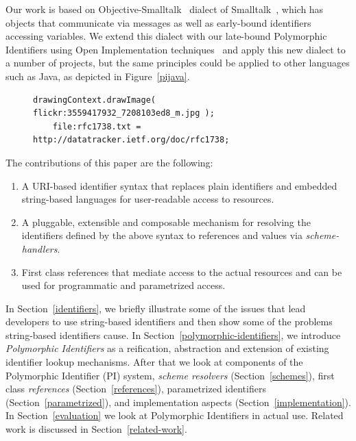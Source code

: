 \documentclass[preprint]{sigplanconf}
\begin{document}
Our work is based on Objective-Smalltalk~\cite{objst} dialect of Smalltalk~\cite{Goldberg1983}, which has objects
that communicate via messages as well as early-bound identifiers accessing variables.  We extend
this dialect with our late-bound Polymorphic Identifiers using Open Implementation techniques~\cite{OpenImplementations} and apply this new dialect to a number of
projects, but the same principles could be applied to other languages such as Java, as depicted in
Figure~\ref{pijava}.


\begin{figure}[htbp]
\begin{lstlisting}[style=numbers,label=pijava,caption=Draw a remote image and download an RFC with Polymorphic Identifiers in Java.]
	drawingContext.drawImage( flickr:3559417932_7208103ed8_m.jpg );
	file:rfc1738.txt = http://datatracker.ietf.org/doc/rfc1738;
\end{lstlisting}
\end{figure}



The contributions of this paper are the following:
\begin{enumerate} 

\item A URI-based identifier syntax that replaces plain identifiers
	and embedded string-based languages for user-readable access to resources.

\item A pluggable, extensible and composable mechanism for resolving the
	identifiers defined by the above syntax to references and values via \emph{scheme-handlers}.

\item First class references that mediate access to the actual resources and can be used
	for programmatic and parametrized access.
	 
	
\end{enumerate}



In Section~\ref{identifiers}, we briefly illustrate some of the issues that lead developers to use string-based
identifiers and then show some of 
the problems string-based identifiers cause.  In Section~\ref{polymorphic-identifiers}, we 
introduce \emph{Polymorphic Identifiers} as a reification, abstraction and extension of existing 
identifier lookup mechanisms.  After that we look at components of the Polymorphic Identifier (PI)
system, \emph{scheme resolvers} (Section~\ref{schemes}), first class \emph{references} (Section~\ref{references}),
parametrized identifiers (Section~\ref{parametrized}), and  implementation aspects (Section~\ref{implementation}).
In Section~\ref{evaluation} we look at Polymorphic Identifiers in actual use.  Related work is discussed in Section~\ref{related-work}.
\end{document}
